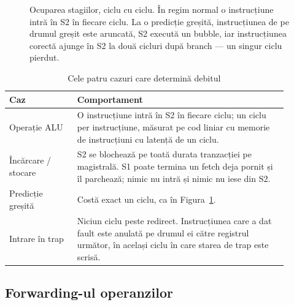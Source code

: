 \documentclass[11pt,openany]{report}
\begin{document}
\begin{figure}[H]
\caption{Ocuparea stagiilor, ciclu cu ciclu. În regim normal o instrucțiune
intră în S2 în fiecare ciclu. La o predicție greșită, instrucțiunea de pe drumul
greșit este aruncată, S2 execută un bubble, iar instrucțiunea corectă ajunge în S2
la două cicluri după branch --- un singur ciclu pierdut.}
\label{fig:pipeocc}
\end{figure}

\begin{table}[H]
\centering
\caption{Cele patru cazuri care determină debitul}
\label{tab:cputiming}
\small
\begin{tabular}{@{}L{0.22\linewidth}L{0.68\linewidth}@{}}
\toprule
\textbf{Caz} & \textbf{Comportament} \\
\midrule
Operație ALU & O instrucțiune intră în S2 în fiecare ciclu; un ciclu per
  instrucțiune, măsurat pe cod liniar cu memorie de instrucțiuni cu latență de
  un ciclu. \\
Încărcare / stocare & S2 se blochează pe toată durata tranzacției pe magistrală.
  S1 poate termina un fetch deja pornit și îl parchează; nimic nu intră și
  nimic nu iese din S2. \\
Predicție greșită & Costă exact un ciclu, ca în Figura~\ref{fig:pipeocc}. \\
Intrare în trap & Niciun ciclu peste redirect. Instrucțiunea care a dat
  fault este anulată pe drumul ei către registrul următor, în același ciclu în
  care starea de trap este scrisă. \\
\bottomrule
\end{tabular}
\end{table}

\subsection{Forwarding-ul operanzilor}
\end{document}
